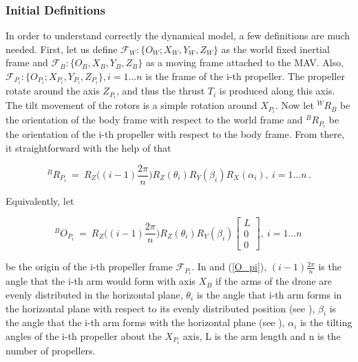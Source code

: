 \subsubsection{Initial Definitions}
\label{sec:definitions}
In order to understand correctly the dynamical model, a few definitions are much
needed. First, let us define $\mathcal{F}_{W} : \{O_{W}; X_{W},  Y_{W},  Z_{W}\}$
as the world fixed inertial frame and $\mathcal{F}_{B}: \{O_{B}, X_{B},  Y_{B},
Z_{B}\}$
as a moving frame attached to the MAV. Also, $\mathcal{F}_{P_{i}} : \{O_{P_{i}};
X_{P_{i}}, Y_{P_{i}},  Z_{P_{i}}\}, i = 1...n$ is the frame of the i-th propeller.
The propeller rotate around the axis $Z_{P_{i}}$, and thus the thrust $T_{i}$ is
produced along this axis. The tilt movement of the rotors is a simple rotation
around $X_{P_{i}}$. Now let $^{W}R_{B}$ be the orientation of the body frame
with respect to the world frame and $^{B}R_{P_{i}}$ be the orientation of the
i-th propeller with respect to the body frame. From there, it
straightforward with the help of  that

\begin{equation}
  \label{rot_b_pi}
  ^{B}R_{P_{i}} \ = \ R_{Z}\bigg((i-1)\frac{2\pi}{n}\bigg) R_Z(\theta_i)
  R_Y(\beta_i) R_{X}(\alpha_{i}),\  i = 1...n\, .
\end{equation}

Equivalently, let

\begin{equation}
  \label{O_pi}
  ^{B}O_{P_{i}} \ = \ R_{Z}\bigg((i-1)\frac{2\pi}{n}\bigg) R_Z(\theta_i) R_Y(\beta_i)
  \begin{bmatrix}
    L \\
    0 \\
    0
  \end{bmatrix}
  ,\   i = 1...n \,
\end{equation}

be the origin of the i-th propeller frame  $\mathcal{F}_{P_{i}}$.
In  and (\ref{O_pi}), $(i-1)\frac{2\pi}{n}$ is the angle that
the i-th arm would form with axis $X_B$ if the arms of the drone are evenly
distributed in the horizontal plane, $\theta_i$ is the angle that i-th arm forms
in the horizontal plane with respect to its evenly distributed position
(see ), $\beta_i$ is the angle that the i-th arm forms with
the horizontal plane (see ), $\alpha_{i}$ is the tilting
angles of the i-th propeller about the $X_{P_{i}}$ axis, L is the arm length and
n is the number of propellers.

